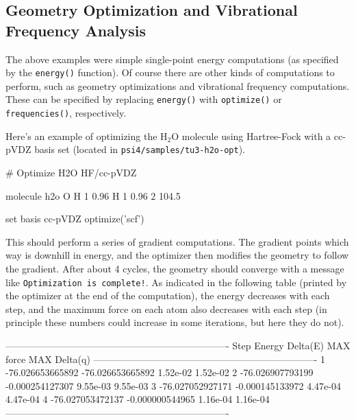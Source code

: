 \subsection{Geometry Optimization and Vibrational Frequency Analysis}
The above examples were simple single-point energy computations
(as specified by the {\tt energy()} function).  Of course there are other
kinds of computations to perform, such as geometry optimizations and
vibrational frequency computations.  These can be specified by replacing
{\tt energy()} with {\tt optimize()} or {\tt frequencies()}, respectively.

Here's an example of optimizing the H$_2$O molecule using Hartree-Fock with
a cc-pVDZ basis set (located in {\tt psi4/samples/tu3-h2o-opt}).
\begin{Snippet}
# Optimize H2O HF/cc-pVDZ

molecule h2o {
  O
  H 1 0.96
  H 1 0.96 2 104.5
}

set basis cc-pVDZ
optimize('scf')
\end{Snippet}

This should perform a series of gradient computations.  The gradient points
which way is downhill in energy, and the optimizer then modifies the
geometry to follow the gradient.  After about 4 cycles, the geometry should
converge with a message like {\tt Optimization is complete!}.  As indicated
in the following table (printed by the optimizer at the end of the
computation), the energy decreases with each step,
and the maximum force on each atom also decreases with each step (in
principle these numbers could increase in some iterations, but here they do
not).

\begin{Snippet}
----------------------------------------------------------------------
Step         Energy             Delta(E)      MAX force   MAX Delta(q)
----------------------------------------------------------------------
  1    -76.026653665892    -76.026653665892    1.52e-02   1.52e-02
  2    -76.026907793199     -0.000254127307    9.55e-03   9.55e-03
  3    -76.027052927171     -0.000145133972    4.47e-04   4.47e-04
  4    -76.027053472137     -0.000000544965    1.16e-04   1.16e-04
----------------------------------------------------------------------
\end{Snippet}

